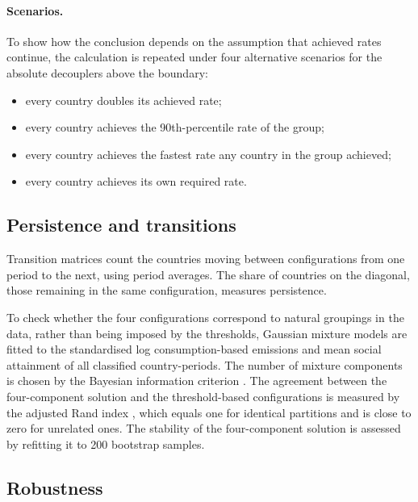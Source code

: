 \paragraph{Scenarios.} To show how the conclusion depends on the assumption that achieved rates continue, the calculation is repeated under four alternative scenarios for the absolute decouplers above the boundary:
\begin{itemize}
\item every country doubles its achieved rate;
\item every country achieves the 90th-percentile rate of the group;
\item every country achieves the fastest rate any country in the group achieved;
\item every country achieves its own required rate.
\end{itemize}

\subsection{Persistence and transitions}

Transition matrices count the countries moving between configurations from one period to the next, using period averages. The share of countries on the diagonal, those remaining in the same configuration, measures persistence.

To check whether the four configurations correspond to natural groupings in the data, rather than being imposed by the thresholds, Gaussian mixture models are fitted to the standardised log consumption-based emissions and mean social attainment of all classified country-periods. The number of mixture components is chosen by the Bayesian information criterion \citep{fraley2002}. The agreement between the four-component solution and the threshold-based configurations is measured by the adjusted Rand index \citep{hubert1985}, which equals one for identical partitions and is close to zero for unrelated ones. The stability of the four-component solution is assessed by refitting it to 200 bootstrap samples.

\subsection{Robustness}\label{sec:robust}

